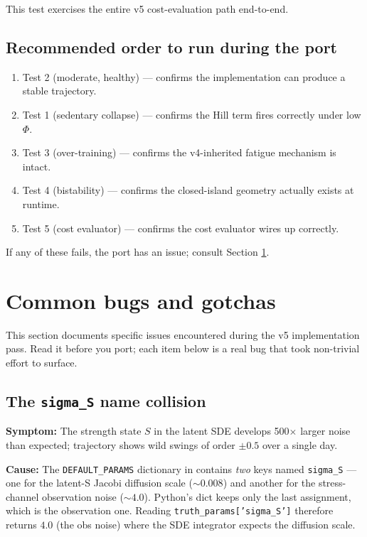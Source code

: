 \documentclass[11pt,a4paper]{article}
\theoremstyle{definition}
\begin{document}
This test exercises the entire v5 cost-evaluation path end-to-end.

\subsection{Recommended order to run during the port}

\begin{enumerate}
  \item Test 2 (moderate, healthy) --- confirms the implementation can produce a stable trajectory.
  \item Test 1 (sedentary collapse) --- confirms the Hill term fires correctly under low $\Phi$.
  \item Test 3 (over-training) --- confirms the v4-inherited fatigue mechanism is intact.
  \item Test 4 (bistability) --- confirms the closed-island geometry actually exists at runtime.
  \item Test 5 (cost evaluator) --- confirms the cost evaluator wires up correctly.
\end{enumerate}

If any of these fails, the port has an issue; consult Section
\ref{sec:bugs}.


\section{Common bugs and gotchas} \label{sec:bugs}

This section documents specific issues encountered during the v5
implementation pass. Read it before you port; each item below is a
real bug that took non-trivial effort to surface.

\subsection{The \texttt{sigma\_S} name collision}

\textbf{Symptom:} The strength state $S$ in the latent SDE develops
500$\times$ larger noise than expected; trajectory shows wild swings of
order $\pm 0.5$ over a single day.

\textbf{Cause:} The \texttt{DEFAULT\_PARAMS} dictionary in
 contains \emph{two} keys named \texttt{sigma\_S} ---
one for the latent-S Jacobi diffusion scale ($\sim 0.008$) and another
for the stress-channel observation noise ($\sim 4.0$). Python's dict
keeps only the last assignment, which is the observation one. Reading
\texttt{truth\_params['sigma\_S']} therefore returns $4.0$ (the obs
noise) where the SDE integrator expects the diffusion scale.
\end{document}

